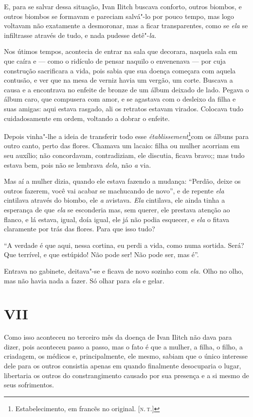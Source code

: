 E, para se salvar dessa situação, Ivan Ilitch buscava conforto, outros
biombos, e outros biombos se formavam e pareciam salvá"-lo por pouco
tempo, mas logo voltavam não exatamente a desmoronar, mas a ficar
transparentes, como se \emph{ela} se infiltrasse através de tudo, e nada
pudesse detê"-\emph{la}.

Nos útimos tempos, acontecia de entrar na sala que decorara, naquela
sala em que caíra e --- como o ridículo de pensar naquilo o envenenava ---
por cuja construção sacrificara a vida, pois sabia que sua doença
começara com aquela contusão, e ver que na mesa de verniz havia um
vergão, um corte. Buscava a causa e a encontrava no enfeite de bronze de
um álbum deixado de lado. Pegava o álbum caro, que compusera com amor, e
se agastava com o desleixo da filha e suas amigas: aqui estava rasgado,
ali os retratos estavam virados. Colocava tudo cuidadosamente em ordem,
voltando a dobrar o enfeite.

Depois vinha"-lhe a ideia de transferir todo esse
\emph{établissement}\footnote{Estabelecimento, em francẽs no original.
  {[}\textsc{n.\,t.}{]}}com os álbuns para outro canto, perto das flores. Chamava
um lacaio: filha ou mulher acorriam em seu auxílio; não concordavam,
contradiziam, ele discutia, ficava bravo;; mas tudo estava bem, pois não
se lembrava \emph{dela,} não \emph{a} via.

Mas aí a mulher dizia, quando ele estava fazendo a mudança: ``Perdão,
deixe os outros fazerem, você vai acabar se machucando de novo'', e de
repente \emph{ela} cintilava através do biombo, ele \emph{a} avistava.
\emph{Ela} cintilava, ele ainda tinha a esperança de que \emph{ela} se
esconderia mas, sem querer, ele prestava atenção ao flanco, e lá estava,
igual, doía igual, ele já não podia esquecer, e \emph{ela} o fitava
claramente por trás das flores. Para que isso tudo?

``A verdade é que aqui, nessa cortina, eu perdi a vida, como numa
sortida. Será? Que terrível, e que estúpido! Não pode ser! Não pode ser,
mas é''.

Entrava no gabinete, deitava"-se e ficava de novo sozinho com \emph{ela.}
Olho no olho, mas não havia nada a fazer. Só olhar para \emph{ela} e
gelar.

\section{VII}

Como isso aconteceu no terceiro mês da doença de Ivan Ilitch não dava
para dizer, pois aconteceu passo a passo, mas o fato é que a mulher, a
filha, o filho, a criadagem, os médicos e, principalmente, ele mesmo,
sabiam que o único interesse dele para os outros consistia apenas em
quando finalmente desocuparia o lugar, libertaria os outros do
constrangimento causado por sua presença e a si mesmo de seus
sofrimentos.

